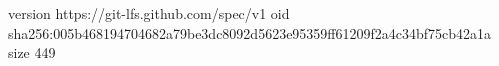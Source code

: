 version https://git-lfs.github.com/spec/v1
oid sha256:005b468194704682a79be3dc8092d5623e95359ff61209f2a4c34bf75cb42a1a
size 449
